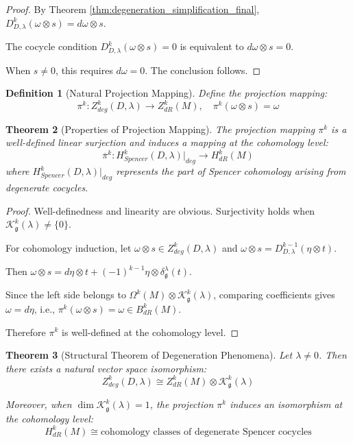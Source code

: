 \documentclass[a4paper,12pt]{extarticle}
\theoremstyle{plain}
\newtheorem{theorem}{Theorem}[section]
\newtheorem{definition}[theorem]{Definition}
\theoremstyle{definition}
\begin{document}
\begin{proof}
By Theorem \ref{thm:degeneration_simplification_final}, $D_{D,\lambda}^k(\omega \otimes s) = d\omega \otimes s$.

The cocycle condition $D_{D,\lambda}^k(\omega \otimes s) = 0$ is equivalent to $d\omega \otimes s = 0$.

When $s \neq 0$, this requires $d\omega = 0$. The conclusion follows.
\end{proof}

\begin{definition}[Natural Projection Mapping]
\label{def:natural_projection}
Define the projection mapping:
$$\pi^k: Z_{deg}^k(D,\lambda) \to Z^k_{dR}(M), \quad \pi^k(\omega \otimes s) = \omega$$
\end{definition}

\begin{theorem}[Properties of Projection Mapping]
\label{thm:projection_properties}
The projection mapping $\pi^k$ is a well-defined linear surjection and induces a mapping at the cohomology level:
$$\overline{\pi}^k: H^k_{Spencer}(D,\lambda)|_{deg} \to H^k_{dR}(M)$$
where $H^k_{Spencer}(D,\lambda)|_{deg}$ represents the part of Spencer cohomology arising from degenerate cocycles.
\end{theorem}

\begin{proof}
Well-definedness and linearity are obvious. Surjectivity holds when $\mathcal{K}_{\mathfrak{g}}^k(\lambda) \neq \{0\}$.

For cohomology induction, let $\omega \otimes s \in Z_{deg}^k(D,\lambda)$ and $\omega \otimes s = D_{D,\lambda}^{k-1}(\eta \otimes t)$.

Then $\omega \otimes s = d\eta \otimes t + (-1)^{k-1}\eta \otimes \delta_{\mathfrak{g}}^{\lambda}(t)$.

Since the left side belongs to $\Omega^k(M) \otimes \mathcal{K}_{\mathfrak{g}}^k(\lambda)$, comparing coefficients gives $\omega = d\eta$, i.e., $\pi^k(\omega \otimes s) = \omega \in B^k_{dR}(M)$.

Therefore $\pi^k$ is well-defined at the cohomology level.
\end{proof}

\begin{theorem}[Structural Theorem of Degeneration Phenomena]
\label{thm:degenerate_structure_theorem}
Let $\lambda \neq 0$. Then there exists a natural vector space isomorphism:
$$Z_{deg}^k(D,\lambda) \cong Z^k_{dR}(M) \otimes \mathcal{K}_{\mathfrak{g}}^k(\lambda)$$

Moreover, when $\dim \mathcal{K}_{\mathfrak{g}}^k(\lambda) = 1$, the projection $\pi^k$ induces an isomorphism at the cohomology level:
$$H^k_{dR}(M) \cong \text{cohomology classes of degenerate Spencer cocycles}$$
\end{theorem}
\end{document}
